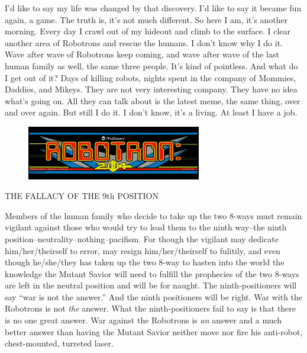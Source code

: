 \documentclass{amsbook}
\begin{document}
I'd like to say my life was changed by that discovery.  I'd like to say it became fun again, a game.  The truth is, it's not much different.  So here I am, it's another morning.  Every day I crawl out of my hideout and climb to the surface.  I clear another area of Robotrons and rescue the humans.  I don't know why I do it.  Wave after wave of Robotrons keep coming, and wave after wave of the last human family as well, the same three people.  It's kind of pointless.  And what do I get out of it?  Days of killing robots, nights spent in the company of Mommies, Daddies, and Mikeys.  They are not very interesting company.  They have no idea what's going on.  All they can talk about is the latest meme, the same thing, over and over again.  But still I do it.  I don't know, it's a living.  At least I have a job.
\clearpage

%

\begin{figure}
  \includegraphics[width=3in]{robotron-2084_marquee.jpg}
\end{figure}
{\ROBOFONTy THE FALLACY OF THE 9th POSITION}

Members of the human family who decide to take up the two 8-ways must
remain vigilant against those who would try to lead them to the ninth
way--the ninth position--neutrality--nothing--pacifism. For though the
vigilant may dedicate him/her/theirself to error, may resign
him/her/theirself to fulitily, and even though he/she/they has taken
up the two 8-way to hasten into the world the knowledge the Mutant
Savior will need to fulfill the prophecies of the two 8-ways are left
in the neutral position and will be for naught. The ninth-positioners
will say ``war is not the answer.'' And the ninth positioners will be
right. War with the Robotrons is not {\em the} answer. What the
ninth-positioners fail to say is that there is no one great answer.
War against the Robotrons is {\em an} answer and a much better answer
than having the Mutant Savior neither move nor fire his anti-robot,
chest-mounted, turreted laser.
\end{document}
